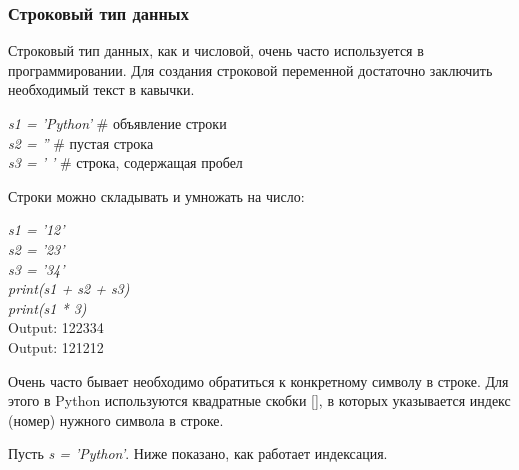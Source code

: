 \subsubsection*{Строковый тип данных}

Строковый тип данных, как и числовой, очень часто используется в программировании. Для создания строковой переменной достаточно заключить необходимый текст в кавычки.

\begin{flushleft}
	\colorbox[rgb]{0.95, 0.95, 0.95}{\textit{s1 = 'Python'}  \# объявление строки} \\
	\colorbox[rgb]{0.95, 0.95, 0.95}{\textit{s2 = ''} \hspace{1.35cm} \# пустая строка} \\
	\colorbox[rgb]{0.95, 0.95, 0.95}{\textit{s3 = ' '} \hspace{0.9cm} \# строка, содержащая пробел}
\end{flushleft}

Строки можно складывать и умножать на число:

\begin{flushleft}
	\colorbox[rgb]{0.95, 0.95, 0.95}{\textit{s1 = '12'}} \\
	\colorbox[rgb]{0.95, 0.95, 0.95}{\textit{s2 = '23'}} \\
	\colorbox[rgb]{0.95, 0.95, 0.95}{\textit{s3 = '34'}} \\
	\colorbox[rgb]{0.95, 0.95, 0.95}{\textit{print(s1 + s2 + s3)}} \\
	\colorbox[rgb]{0.95, 0.95, 0.95}{\textit{print(s1 * 3)}} \\
	\vspace{1cm}
	\colorbox[rgb]{0.95, 0.95, 0.95}{Output: 122334} \\
	\colorbox[rgb]{0.95, 0.95, 0.95}{Output: 121212} \\
\end{flushleft}

Очень часто бывает необходимо обратиться к конкретному символу в строке. Для этого в Python используются квадратные скобки [], в которых указывается индекс (номер) нужного символа в строке.

Пусть \colorbox[rgb]{0.95, 0.95, 0.95}{\textit{s = 'Python'}}. Ниже показано, как работает индексация.

